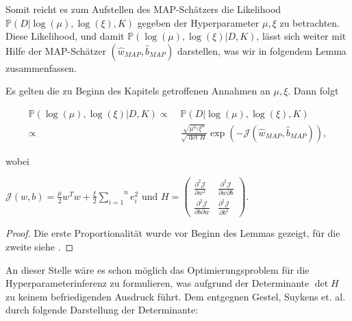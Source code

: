 Somit reicht es zum Aufstellen des MAP-Schätzers die Likelihood  $\mathbb{P}(D\vert \log(\mu),\log(\xi),K)$ gegeben der Hyperparameter $\mu, \xi$ zu betrachten. Diese Likelihood, und damit $\mathbb{P}(\log(\mu), \log(\xi)\vert D, K)$, lässt sich weiter mit Hilfe der MAP-Schätzer $(\hat{w}_{MAP}, \hat{b}_{MAP})$ darstellen, was wir in folgendem Lemma zusammenfassen.

\begin{lemma}

Es gelten die zu Beginn des Kapitels getroffenen Annahmen an $\mu, \xi$. Dann folgt

\begin{align*}
	\mathbb{P}(\log(\mu), \log(\xi)\vert D, K) \propto\; & \mathbb{P}(D\vert \log(\mu),			\log(\xi),K) \\
	\propto\; & \frac{\sqrt{\mu^{n_f} \xi^n}}	{\sqrt{\det H}} \exp(- \mathcal{J}(\hat{w}			_{MAP},\hat{b}_{MAP})),
\end{align*}

wobei 
\begin{center}
	$\mathcal{J}(w,b) = \frac{\mu}{2}w^T w + \frac{\xi}{2}\overset{n}{\underset{i=1}			{\sum}} e_i ^2 \text{ und } H = \begin{pmatrix}
	\frac{\partial^2 \mathcal{J}}{\partial w^2 } & \frac{\partial^2 \mathcal{J}}				{\partial w \partial b } \\
	\frac{\partial^2 \mathcal{J}}{\partial b \partial w } & \frac{\partial^2 					\mathcal{J}}{\partial b^2 }
	\end{pmatrix}.$
\end{center}

\end{lemma}

\begin{proof}
Die erste Proportionalität wurde vor Beginn des Lemmas gezeigt, für die zweite siehe \cite{LS-SVM}.
\end{proof}

An dieser Stelle wäre es schon möglich das Optimierungsproblem für die Hyperparameterinferenz zu formulieren, was aufgrund der Determinante $\det H$ zu keinem befriedigenden Ausdruck führt. Dem entgegnen Gestel, Suykens et. al. durch folgende Darstellung der Determinante:

